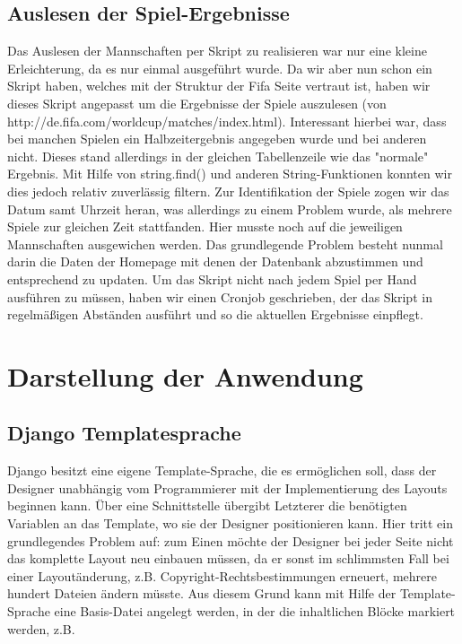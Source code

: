 \section{Auslesen der Spiel-Ergebnisse}
Das Auslesen der Mannschaften per Skript zu realisieren war nur eine kleine 
Erleichterung, da es nur einmal ausgeführt wurde. Da wir aber nun schon ein 
Skript haben, welches mit der Struktur der Fifa Seite vertraut ist, haben wir 
dieses Skript angepasst um die Ergebnisse der Spiele auszulesen  (von
http://de.fifa.com/worldcup/matches/index.html). Interessant hierbei war, dass 
bei manchen Spielen ein Halbzeitergebnis angegeben wurde und bei anderen nicht.
Dieses stand allerdings in der gleichen Tabellenzeile wie das "normale" 
Ergebnis. Mit Hilfe von string.find() und anderen String-Funktionen konnten wir
dies jedoch relativ zuverlässig filtern. Zur Identifikation der Spiele zogen
wir  das Datum samt Uhrzeit heran, was allerdings zu einem Problem wurde, als 
mehrere Spiele zur gleichen Zeit stattfanden. Hier musste noch auf die 
jeweiligen Mannschaften ausgewichen werden. Das grundlegende Problem besteht 
nunmal darin die Daten der Homepage mit denen der Datenbank abzustimmen und 
entsprechend zu updaten. Um das Skript nicht nach jedem Spiel per Hand
ausführen  zu müssen, haben wir einen Cronjob geschrieben, der das Skript in 
regelmäßigen Abständen ausführt und so die aktuellen Ergebnisse einpflegt.

\chapter{Darstellung der Anwendung}
\section{Django Templatesprache}
Django besitzt eine eigene Template-Sprache, die es ermöglichen soll, dass der 
Designer unabhängig vom Programmierer mit der Implementierung des Layouts 
beginnen kann. Über eine Schnittstelle übergibt Letzterer die benötigten 
Variablen an das Template, wo sie der Designer positionieren kann. Hier tritt 
ein grundlegendes Problem auf: zum Einen möchte der Designer bei jeder Seite 
nicht das komplette Layout neu einbauen müssen, da er sonst im schlimmsten Fall
bei einer Layoutänderung, z.B. Copyright-Rechtsbestimmungen erneuert, mehrere 
hundert Dateien ändern müsste. Aus diesem Grund kann mit Hilfe der 
Template-Sprache eine Basis-Datei angelegt werden, in der die inhaltlichen 
Blöcke markiert werden, z.B.

